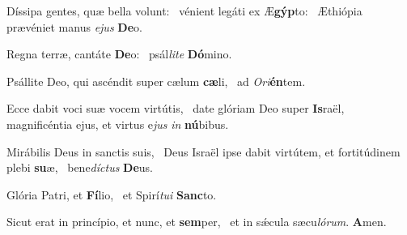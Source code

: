 \item Díssipa gentes, quæ bella volunt:~\pscross{} vénient legáti ex Æ\textbf{gýp}to:~\psstar{} Æthiópia prævéniet manus \textit{ejus} \textbf{De}o.
\item Regna terræ, cantáte \textbf{De}o:~\psstar{} psál\textit{lite} \textbf{Dó}mino.
\item Psállite Deo, qui ascéndit super cælum \textbf{cæ}li,~\psstar{} ad \textit{Ori}\textbf{én}tem.
\item Ecce dabit voci suæ vocem virtútis,~\pscross{} date glóriam Deo super \textbf{Is}raël,~\psstar{} magnificéntia ejus, et virtus e\textit{jus} \textit{in} \textbf{nú}bibus.
\item Mirábilis Deus in sanctis suis,~\pscross{} Deus Israël ipse dabit virtútem, et fortitúdinem plebi \textbf{su}æ,~\psstar{} bene\textit{díctus} \textbf{De}us.
\item Glória Patri, et \textbf{Fí}lio,~\psstar{} et Spirí\textit{tui} \textbf{Sanc}to.
\item Sicut erat in princípio, et nunc, et \textbf{sem}per,~\psstar{} et in sǽcula sæcu\textit{lórum}. \textbf{A}men.
